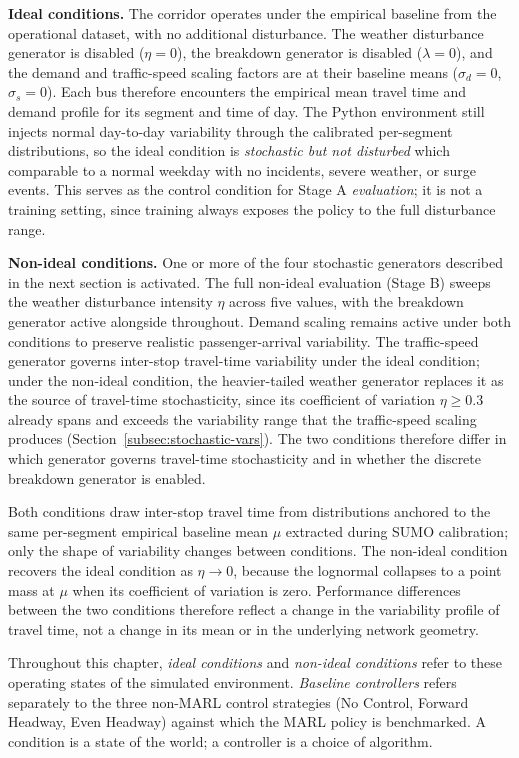\textbf{Ideal conditions.} The corridor operates under the empirical baseline from the operational dataset, with no additional disturbance. The weather disturbance generator is disabled ($\eta = 0$), the breakdown generator is disabled ($\lambda = 0$), and the demand and traffic-speed scaling factors are at their baseline means ($\sigma_d = 0$, $\sigma_s = 0$). Each bus therefore encounters the empirical mean travel time and demand profile for its segment and time of day. The Python environment still injects normal day-to-day variability through the calibrated per-segment distributions, so the ideal condition is \textit{stochastic but not disturbed} which comparable to a normal weekday with no incidents, severe weather, or surge events. This serves as the control condition for Stage A \textit{evaluation}; it is not a training setting, since training always exposes the policy to the full disturbance range.

\textbf{Non-ideal conditions.} One or more of the four stochastic generators described in the next section is activated. The full non-ideal evaluation (Stage B) sweeps the weather disturbance intensity $\eta$ across five values, with the breakdown generator active alongside throughout. Demand scaling remains active under both conditions to preserve realistic passenger-arrival variability. The traffic-speed generator governs inter-stop travel-time variability under the ideal condition; under the non-ideal condition, the heavier-tailed weather generator replaces it as the source of travel-time stochasticity, since its coefficient of variation $\eta \geq 0.3$ already spans and exceeds the variability range that the traffic-speed scaling produces (Section~\ref{subsec:stochastic-vars}). The two conditions therefore differ in which generator governs travel-time stochasticity and in whether the discrete breakdown generator is enabled.

Both conditions draw inter-stop travel time from distributions anchored to the same per-segment empirical baseline mean $\mu$ extracted during SUMO calibration; only the shape of variability changes between conditions. The non-ideal condition recovers the ideal condition as $\eta \to 0$, because the lognormal collapses to a point mass at $\mu$ when its coefficient of variation is zero. Performance differences between the two conditions therefore reflect a change in the variability profile of travel time, not a change in its mean or in the underlying network geometry.

Throughout this chapter, \textit{ideal conditions} and \textit{non-ideal conditions} refer to these operating states of the simulated environment. \textit{Baseline controllers} refers separately to the three non-MARL control strategies (No Control, Forward Headway, Even Headway) against which the MARL policy is benchmarked. A condition is a state of the world; a controller is a choice of algorithm.

